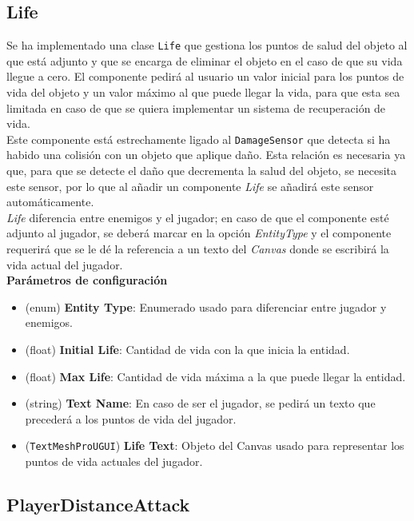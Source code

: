 \subsection{Life} \label{sec:life}

Se ha implementado una clase \texttt{Life} que gestiona los puntos de salud del objeto al que está adjunto y que se encarga de eliminar el objeto en el caso de que su vida llegue a cero. El componente pedirá al usuario un valor inicial para los puntos de vida del objeto y un valor máximo al que puede llegar la vida, para que esta sea limitada en caso de que se quiera implementar un sistema de recuperación de vida.\\

Este componente está estrechamente ligado al \texttt{DamageSensor} que detecta si ha habido una colisión con un objeto que aplique daño. Esta relación es necesaria ya que, para que se detecte el daño que decrementa la salud del objeto, se necesita este sensor, por lo que al añadir un componente \textit{Life} se añadirá este sensor automáticamente.\\

\textit{Life} diferencia entre enemigos y el jugador; en caso de que el componente esté adjunto al jugador, se deberá marcar en la opción \textit{EntityType} y el componente requerirá que se le dé la referencia a un texto del \textit{Canvas} donde se escribirá la vida actual del jugador.\\

\textbf{Parámetros de configuración}
\begin{itemize}
	\item (enum) \textbf{Entity Type}: Enumerado usado para diferenciar entre jugador y enemigos.
	\item (float) \textbf{Initial Life}: Cantidad de vida con la que inicia la entidad.
	\item (float) \textbf{Max Life}: Cantidad de vida máxima a la que puede llegar la entidad.
	\item (string) \textbf{Text Name}: En caso de ser el jugador, se pedirá un texto que precederá a los puntos de vida del jugador.
	\item (\texttt{TextMeshProUGUI}) \textbf{Life Text}: Objeto del Canvas usado para representar los puntos de vida actuales del jugador.
\end{itemize}

\subsection{PlayerDistanceAttack}

